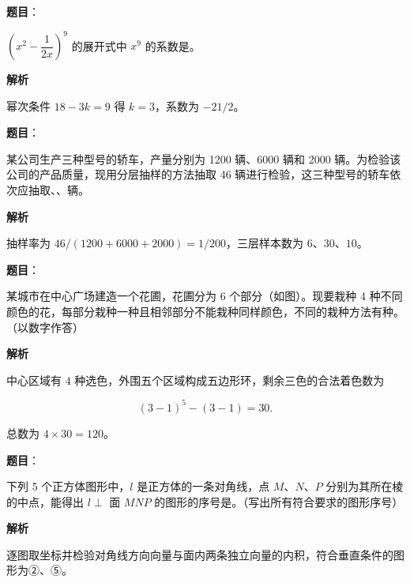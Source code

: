 \begin{answer}

\textbf{题目}：

$\left(x^2-\dfrac1{2x}\right)^9$ 的展开式中 $x^9$ 的系数是\gkblank{}。

\textbf{解析}

幂次条件 $18-3k=9$ 得 $k=3$，系数为 $-21/2$。


\end{answer}
\begin{answer}

\textbf{题目}：

某公司生产三种型号的轿车，产量分别为 1200 辆、6000 辆和 2000 辆。为检验该公司的产品质量，现用分层抽样的方法抽取 46 辆进行检验，这三种型号的轿车依次应抽取\gkblank{}、\gkblank{}、\gkblank{}辆。

\textbf{解析}

抽样率为 $46/(1200+6000+2000)=1/200$，三层样本数为 $6\text{、}30\text{、}10$。


\end{answer}
\begin{answer}

\textbf{题目}：

某城市在中心广场建造一个花圃，花圃分为 6 个部分（如图）。现要栽种 4 种不同颜色的花，每部分栽种一种且相邻部分不能栽种同样颜色，不同的栽种方法有\gkblank{}种。（以数字作答）
\nopagebreak[4]
\begin{center}\end{center}
\nopagebreak[4]
\textbf{解析}

中心区域有 $4$ 种选色，外围五个区域构成五边形环，剩余三色的合法着色数为

\nopagebreak[4]
\[
(3-1)^5-(3-1)=30.
\]

总数为 $4\times30=120$。


\end{answer}
\begin{answer}

\textbf{题目}：

下列 5 个正方体图形中，$l$ 是正方体的一条对角线，点 $M\text{、}N\text{、}P$ 分别为其所在棱的中点，能得出 $l\perp$ 面 $MNP$ 的图形的序号是\gkblank{}。（写出所有符合要求的图形序号）
\nopagebreak[4]
\begin{center}\end{center}
\nopagebreak[4]
\textbf{解析}

逐图取坐标并检验对角线方向向量与面内两条独立向量的内积，符合垂直条件的图形为②、⑤。


\end{answer}


